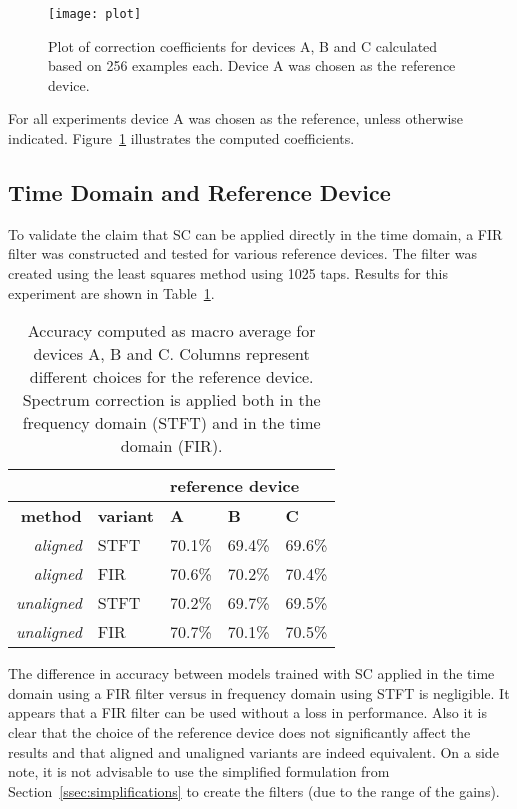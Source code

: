 \documentclass[a4paper]{article}
\begin{document}
\begin{figure}[tbh]
    \centering
    \texttt{[image: plot]}
    \caption{Plot of correction coefficients for devices A, B and C calculated based on 256 examples each. Device A was chosen as the reference device.}
    \label{fig:cc}
\end{figure}

For all experiments device A was chosen as the reference, unless otherwise indicated. Figure~\ref{fig:cc} illustrates the computed coefficients.


\subsection{Time Domain and Reference Device}
\label{ssec:fir-n-ref}

To validate the claim that SC can be applied directly in the time domain, a FIR filter was constructed and tested for various reference devices. The filter was created using the least squares method using 1025 taps. Results for this experiment are shown in Table~\ref{tab:fir-n-ref}. 

\begin{table}[thb]
\centering
\caption{Accuracy computed as macro average for devices A, B and C. Columns represent different choices for the reference device. Spectrum correction is applied both in the frequency domain (STFT) and in the time domain (FIR).}
\begin{tabular}{@{}r|l|lll@{}}
\toprule
\multicolumn{2}{r}{} & \multicolumn{3}{l}{\textbf{reference device}} \\ 
\midrule
\textbf{method}     &\textbf{variant}& \textbf{A} & \textbf{B} & \textbf{C}          \\
\midrule
\textit{aligned}   & STFT & 70.1\%     & 69.4\%     & 69.6\%              \\
\textit{aligned}   & FIR  & 70.6\%     & 70.2\%     & 70.4\%              \\ 
\textit{unaligned} & STFT & 70.2\%     & 69.7\%     & 69.5\%              \\
\textit{unaligned} & FIR  & 70.7\%     & 70.1\%     & 70.5\%              \\ 
\bottomrule
\end{tabular}
\label{tab:fir-n-ref}
\end{table}

The difference in accuracy between models trained with SC applied in the time domain using a FIR filter versus in frequency domain using STFT is negligible. It appears that a FIR filter can be used without a loss in performance.
Also it is clear that the choice of the reference device does not significantly affect the results and that aligned and unaligned variants are indeed equivalent.
On a side note, it is not advisable to use the simplified formulation from Section~\ref{ssec:simplifications} to create the filters (due to the range of the gains).
\end{document}
